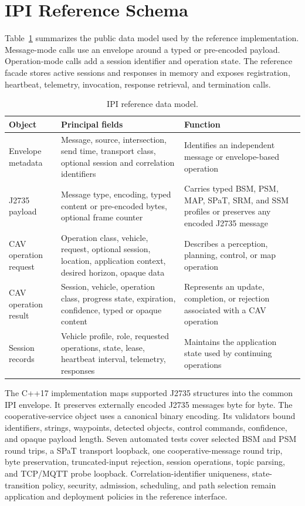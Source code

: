 \section{IPI Reference Schema}
\label{app:ipi}

Table~\ref{tab:ipi-schema} summarizes the public data model used by the
reference implementation. Message-mode calls use an envelope around a typed or
pre-encoded payload. Operation-mode calls add a session identifier and operation
state. The reference facade stores active sessions and responses in memory and
exposes registration, heartbeat, telemetry, invocation, response retrieval,
and termination calls.

\begin{table}[t]
  \caption{IPI reference data model.}
  \label{tab:ipi-schema}
  \centering
  \footnotesize
  \setlength{\tabcolsep}{3pt}
  \begin{tabular}{@{}p{}p{}p{}@{}}
    \toprule
    Object & Principal fields & Function \\
    \midrule
    Envelope metadata & Message, source, intersection, send time, transport class, optional session and correlation identifiers & Identifies an independent message or envelope-based operation \\
    J2735 payload & Message type, encoding, typed content or pre-encoded bytes, optional frame counter & Carries typed BSM, PSM, MAP, SPaT, SRM, and SSM profiles or preserves any encoded J2735 message \\
    CAV operation request & Operation class, vehicle, request, optional session, location, application context, desired horizon, opaque data & Describes a perception, planning, control, or map operation \\
    CAV operation result & Session, vehicle, operation class, progress state, expiration, confidence, typed or opaque content & Represents an update, completion, or rejection associated with a CAV operation \\
    Session records & Vehicle profile, role, requested operations, state, lease, heartbeat interval, telemetry, responses & Maintains the application state used by continuing operations \\
    \bottomrule
  \end{tabular}
\end{table}

The C++17 implementation maps supported J2735 structures into the common IPI
envelope. It preserves externally encoded J2735 messages byte for byte. The
cooperative-service object uses a canonical binary encoding. Its validators
bound identifiers, strings, waypoints, detected objects, control commands,
confidence, and opaque payload length. Seven automated tests cover selected
BSM and PSM round trips, a SPaT transport loopback, one cooperative-message
round trip, byte preservation, truncated-input rejection, session operations,
topic parsing, and TCP/MQTT probe loopback. Correlation-identifier uniqueness,
state-transition policy, security, admission, scheduling, and path selection
remain application and deployment policies in the reference interface.

